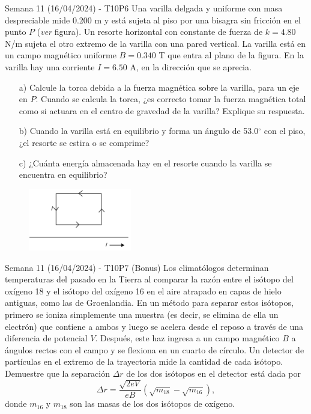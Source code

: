 \begin{frame}{Semana 11 (16/04/2024) - T10P6}
\footnotesize
    Una varilla delgada
y uniforme con masa despreciable mide
0.200 m y está sujeta al piso por una 
bisagra sin fricción en el punto $P$ (\textit{ver} figura). Un resorte horizontal con constante de fuerza de $k = 4.80$ N/m sujeta 
el otro extremo de la varilla con una
pared vertical. La varilla está en un
campo magnético uniforme $B = 0.340$ T
que entra al plano de la figura. En la 
varilla hay una corriente $I = 6.50$ A, en
la dirección que se aprecia.

\begin{itemize}
    \item[a)] Calcule la torca debida a la fuerza 
magnética sobre la varilla, para un eje en $P$. Cuando se calcula la 
torca, ¿es correcto tomar la fuerza magnética total como si actuara en
el centro de gravedad de la varilla? Explique su respuesta.
    \item[b)] Cuando
la varilla está en equilibrio y forma un ángulo de 53.0$^\circ$ con el piso, ¿el
resorte se estira o se comprime?
    \item[c)] ¿Cuánta energía almacenada hay 
en el resorte cuando la varilla se encuentra en equilibrio?
\end{itemize}

\vspace{-1em}

\begin{figure}
    \centering
    \includegraphics[width=0.4\textwidth, height=0.3\textwidth]{figures/t10p3.png}
\end{figure}
    
\end{frame}

\begin{frame}{Semana 11 (16/04/2024) - T10P7 (Bonus)}
\small
    Los climatólogos determinan temperaturas del
pasado en la Tierra al comparar la razón entre el isótopo del oxígeno
18 y el isótopo del oxígeno 16 en el aire atrapado en capas de hielo
antiguas, como las de Groenlandia. En un método para separar estos
isótopos, primero se ioniza simplemente una muestra (es decir, se elimina de ella un electrón) que contiene a ambos y luego se acelera
desde el reposo a través de una diferencia de potencial $V$. Después,
este haz ingresa a un campo magnético $B$ a ángulos rectos con el
campo y se flexiona en un cuarto de círculo. Un detector de partículas
en el extremo de la trayectoria mide la cantidad de cada isótopo. Demuestre que la separación $\Delta r$ de los dos isótopos en el detector
está dada por $$\Delta r = \frac{\sqrt{2eV}}{eB}  \left(\sqrt{m_{18}}-\sqrt{m_{16}}\right),$$ donde $m_{16}$ y $m_{18}$ son las masas de los dos isótopos de oxígeno.
    
\end{frame}

